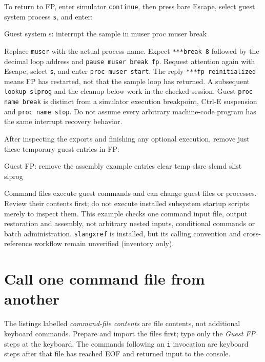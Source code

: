 To return to FP, enter simulator \texttt{continue}, then press bare Escape,
select guest system process \texttt{s}, and enter:

\begin{commandexample}{Guest system s: interrupt the sample in muser}
proc muser break
\end{commandexample}

Replace \texttt{muser} with the actual process name. Expect
\texttt{***break 8} followed by the decimal loop address and
\texttt{pause muser break fp}. Request attention again with Escape, select
\texttt{s}, and enter \texttt{proc muser start}. The reply
\texttt{***fp reinitialized} means FP has restarted, not that the sample loop
has returned. A subsequent \texttt{lookup slprog} and the cleanup below work
in the checked session. Guest \texttt{proc name break} is distinct from a
simulator execution breakpoint, Ctrl-E suspension and \texttt{proc name stop}.
Do not assume every arbitrary machine-code program has the same interrupt
recovery behavior.

After inspecting the exports and finishing any optional execution, remove just
these temporary guest entries in FP:

\begin{commandexample}{Guest FP: remove the assembly example entries}
clear temp slsrc slcmd slist slprog
\end{commandexample}

Command files execute guest commands and can change guest files or processes. Review their contents first; do not execute installed subsystem startup scripts merely to inspect them. This example checks one command input file, output restoration and assembly, not arbitrary nested inputs, conditional commands or batch administration. \passthrough{\lstinline!slangxref!} is installed, but its calling convention and cross-reference workflow remain unverified (inventory only).

\section{Call one command file from another}\label{call-one-command-file-from-another}

The listings labelled \emph{command-file contents} are file contents, not additional keyboard commands. Prepare and import the files first; type only the \emph{Guest FP} steps at the keyboard. The commands following an \passthrough{\lstinline!i!} invocation are keyboard steps after that file has reached EOF and returned input to the console.

